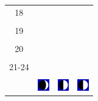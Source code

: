 \documentclass[twoside, a4paper,12pt, tikz]{scrartcl}
\begin{document}
\begin{tabularx}{\linewidth}{|c|X|X|X|}
        &   &       &    \\
      \hline
      18&   &       &    \\
        &   &       &    \\
      \hline
      19&   &       &    \\
        &   &       &    \\
      \hline
      20&   &       &    \\
        &   &       &    \\
      \hline
      21-24&   &       &    \\
        &   &       &    \\
      \hline  
      & \vspace{0.01cm} \centerline{\includegraphics[width=0.5cm]{moon_phases/Moon_phase_1.svg.png}} \vspace{0.1cm} & \vspace{0.01cm} \centerline{\includegraphics[width=0.5cm]{moon_phases/Moon_phase_2.svg.png}} \vspace{0.1cm} & \vspace{0.01cm} \centerline{\includegraphics[width=0.5cm]{moon_phases/Moon_phase_2.svg.png}} \vspace{0.1cm}\\
      \hline   
    \end{tabularx}




    \newpage

        \noindent
\end{document}
